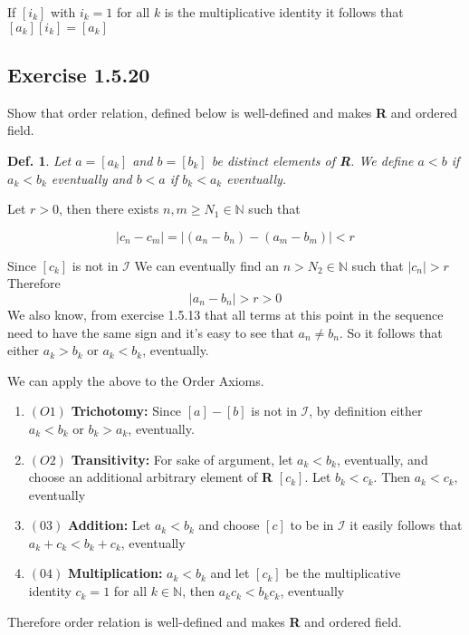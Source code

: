 \documentclass{tufte-book}
\theoremstyle{mytheoremstyle}
\theoremstyle{mylemstyle}
\theoremstyle{mydefstyle}
\newtheorem*{mydef}{Def.}
\begin{document}
If $[i_k]$  with $i_k=1$ for all $k$ is the multiplicative identity it follows that $[a_k][i_k] = [a_k]$


\subsection{Exercise 1.5.20}
Show that order relation, defined below is well-defined and makes \textbf{R} and ordered field. 

\begin{mydef}Let $a = [a_k]$ and $b=[b_k]$ be distinct elements of \textbf{R}. We define $a<b$ if $a_k < b_k$ eventually and $b < a$ if $b_k < a_k$ eventually.
\end{mydef}

Let $r > 0$, then there exists $n,m \geq N_1 \in \mathbb{N}$ such that

\[|c_n - c_m| = |(a_n-b_n) - (a_m-b_m)| < r\]

Since $[c_k]$ is not in $\mathcal{I}$ We can eventually find an $n > N_2 \in \mathbb{N}$ such that $|c_n| > r$ Therefore
\[|a_n-b_n| > r > 0\]  We also know, from exercise 1.5.13 that all terms at this point in the sequence need to have the same sign and it's easy to see that $a_n \neq b_n$.  So it follows that either $a_k > b_k$ or $a_k < b_k$, eventually.

We can apply the above to the Order Axioms.
\begin{enumerate}
\item $(O1)$ \textbf{Trichotomy:}  Since $[a] - [b]$ is not in $\mathcal{I}$, by definition either $a_k < b_k$ or $b_k > a_k$, eventually.

\item $(O2)$ \textbf{Transitivity:} For sake of argument, let $a_k < b_k$, eventually, and choose an additional arbitrary element of \textbf{R} $[c_k]$. Let $b_k < c_k$. Then $a_k < c_k$, eventually

\item $(03)$ \textbf{Addition:} Let $a_k < b_k$ and choose $[c]$ to be in $\mathcal{I}$ it easily follows that $a_k + c_k < b_k + c_k$,  eventually

\item $(04)$ \textbf{Multiplication:} $a_k < b_k$ and let $[c_k]$ be the multiplicative\\ identity $c_k=1$ for all $k \in \mathbb{N}$, then $a_kc_k<b_kc_k$, eventually
\end{enumerate}

Therefore order relation is well-defined and makes \textbf{R} and ordered field.
\end{document}
